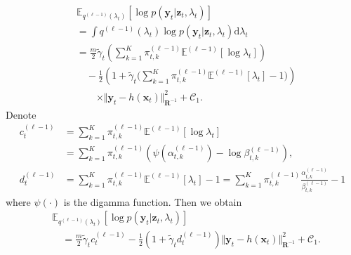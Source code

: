 \documentclass[10pt,twocolumn,twoside]{IEEEtran}
\newcommand{\E}[2][]{ \mathbb{E}_{#1}\left[#2\right] } %
\newcommand{\cm}{\text{,}} %
\newcommand{\fs}{\text{.}} %
\newcommand{\x}{{ \bm{x} }}
\newcommand{\y}{{ \bm{y} }}
\newcommand{\z}{{ \bm{z} }}
\begin{document}
\begin{appendices}
\begin{equation*}
\begin{split}
    &\E[q^{(\ell-1)}(\lambda_t)]{\log{p(\y_t|\z_t,\lambda_t)}}\\
    &= \int{q^{(\ell-1)}(\lambda_t)\log{p(\y_t|\z_t,\lambda_t)}}\mathrm{d}\lambda_t \\
    &= \frac{m}{2}\tilde\gamma_t\left(\sum_{k=1}^K\pi_{t,k}^{(\ell-1)}\mathbb{E}^{(\ell-1)}[\log\lambda_t]\right) \\
    &\quad- \frac{1}{2}\left(1+\tilde\gamma_t\bigg(\sum_{k=1}^K\pi_{t,k}^{(\ell-1)}\mathbb{E}^{(\ell-1)}[\lambda_t]-1\bigg)\right)\\
    &\qquad\times \Vert\y_t-h(\x_t)\Vert^2_{\bm{R}^{-1}} + \mathcal{C}_1 \fs
\end{split}
\end{equation*}
Denote
\begin{equation*}
\begin{split}
    c_t^{(\ell-1)} &= \sum_{k=1}^K\pi_{t,k}^{(\ell-1)}\mathbb{E}^{(\ell-1)}[\log\lambda_t]\\
    &= \sum_{k=1}^K\pi_{t,k}^{(\ell-1)}\left(\psi(\alpha_{t,k}^{(\ell-1)})-\log\beta_{t,k}^{(\ell-1)}\right) \cm\\
    d_t^{(\ell-1)} &= \sum_{k=1}^K\pi_{t,k}^{(\ell-1)}\mathbb{E}^{(\ell-1)}[\lambda_t]-1 = \sum_{k=1}^K\pi_{t,k}^{(\ell-1)}\frac{\alpha_{t,k}^{(\ell-1)}}{\beta_{t,k}^{(\ell-1)}}-1
\end{split}
\end{equation*}
where $\psi(\cdot)$ is the digamma function. Then we obtain
\begin{equation*}
\begin{split}
    &\E[q^{(\ell-1)}(\lambda_t)]{\log{p(\y_t|\z_t,\lambda_t)}} \\
    &\quad= \frac{m}{2}\tilde\gamma_tc_t^{(\ell-1)} - \frac{1}{2}(1+\tilde\gamma_td_t^{(\ell-1)})\Vert\y_t-h(\x_t)\Vert^2_{\bm{R}^{-1}} + \mathcal{C}_1 \fs
\end{split}
\end{equation*}


\end{appendices}
\end{document}

